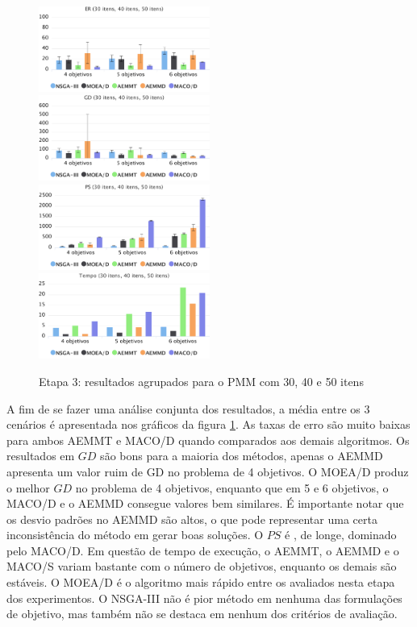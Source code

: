 \begin{figure}[!htbp]
	\caption{Etapa 3: resultados agrupados para o PMM com 30, 40 e 50 itens}
	\label{fig_exp3_pmm_todos}
	\includegraphics[width=0.5\textwidth]{cap_experimentos/figs/etapa3/er-mkp-todos}
	\includegraphics[width=0.5\textwidth]{cap_experimentos/figs/etapa3/gd-mkp-todos}
	\includegraphics[width=0.5\textwidth]{cap_experimentos/figs/etapa3/ps-mkp-todos}
	\includegraphics[width=0.5\textwidth]{cap_experimentos/figs/etapa3/time-mkp-todos}
\end{figure}

A fim de se fazer uma análise conjunta dos resultados, a média entre os 3 cenários é apresentada nos gráficos da figura \ref{fig_exp3_pmm_todos}. As taxas de erro são muito baixas para ambos AEMMT e MACO/D quando comparados aos demais algoritmos. Os resultados em $GD$ são bons para a maioria dos métodos, apenas o AEMMD apresenta um valor ruim de GD no problema de 4 objetivos. O MOEA/D produz o melhor $GD$ no problema de 4 objetivos, enquanto que em 5 e 6 objetivos, o MACO/D e o AEMMD consegue valores bem similares. É importante notar que os desvio padrões no AEMMD são altos, o que pode representar uma certa inconsistência do método em gerar boas soluções. O $PS$ é , de longe, dominado pelo MACO/D. Em questão de tempo de execução, o AEMMT, o AEMMD e o MACO/S variam bastante com o número de objetivos, enquanto os demais são estáveis. O MOEA/D é o algoritmo mais rápido entre os avaliados nesta etapa dos experimentos. O NSGA-III não é pior método em nenhuma das formulações de objetivo, mas também não se destaca em nenhum dos critérios de avaliação.


